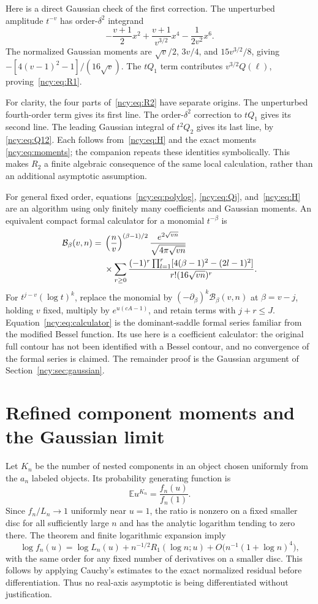 \documentclass[11pt,letterpaper]{article}
\numberwithin{equation}{section}
\theoremstyle{remark}\newtheorem{remark}[theorem]{Remark}
\newcommand{\EE}{\mathbb E}
\theoremstyle{definition}\newtheorem{definition}[theorem]{Definition}\theoremstyle{plain}
\begin{document}
Here is a direct Gaussian check of the first correction. The
unperturbed amplitude $t^{-v}$ has order-$\delta^2$ integrand
\[
 -\frac{v+1}{2}x^2+\frac{v+1}{v^{3/2}}x^4-\frac1{2v^2}x^6.
\]
The normalized Gaussian moments are $\sqrt v/2$, $3v/4$, and
$15v^{3/2}/8$, giving $-[4(v-1)^2-1]/(16\sqrt v)$. The $tQ_1$ term
contributes $v^{3/2}Q(\ell)$, proving~\eqref{ncy:eq:R1}.

For clarity, the four parts of~\eqref{ncy:eq:R2} have separate origins.
The unperturbed fourth-order term gives its first line. The
order-$\delta^2$ correction to $tQ_1$ gives its second line. The
leading Gaussian integral of $t^2Q_2$ gives its last line, by
\eqref{ncy:eq:Q12}. Each follows from~\eqref{ncy:eq:H} and the exact moments
\eqref{ncy:eq:moments}; the companion repeats these identities symbolically.
This makes $R_2$ a finite algebraic consequence of the same local
calculation, rather than an additional asymptotic assumption.

For general fixed order, equations~\eqref{ncy:eq:polylog},
\eqref{ncy:eq:Qj}, and~\eqref{ncy:eq:H} are an algorithm using only finitely
many coefficients and Gaussian moments. An equivalent compact
formal calculator for a monomial $t^{-\beta}$ is
\begin{align}\label{ncy:eq:calculator}
 \mathcal B_\beta(v,n)={}&
 \left(\frac nv\right)^{(\beta-1)/2}
 \frac{e^{2\sqrt{vn}}}{\sqrt{4\pi\sqrt{vn}}}\notag\\
 &\times\sum_{r\geq0}
 \frac{(-1)^r\prod_{l=1}^r[4(\beta-1)^2-(2l-1)^2]}
      {r!(16\sqrt{vn})^r}.
\end{align}
For $t^{j-v}(\log t)^k$, replace the monomial by
$(-\partial_\beta)^k\mathcal B_\beta(v,n)$ at $\beta=v-j$,
holding $v$ fixed, multiply by $e^{u(cA-1)}$, and retain terms with
$j+r\leq J$. Equation~\eqref{ncy:eq:calculator} is the dominant-saddle
formal series familiar from the modified Bessel function. Its use
here is a coefficient calculator: the original full contour has not
been identified with a Bessel contour, and no convergence of the
formal series is claimed. The remainder proof is the Gaussian
argument of Section~\ref{ncy:sec:gaussian}.

\section{Refined component moments and the Gaussian limit}\label{ncy:sec:probability}
Let $K_n$ be the number of nested components in an object chosen
uniformly from the $a_n$ labeled objects. Its probability generating
function is
\[
 \EE u^{K_n}=\frac{f_n(u)}{f_n(1)}.
\]
Since $f_n/L_n\to1$ uniformly near $u=1$, the ratio is nonzero on a
fixed smaller disc for all sufficiently large $n$ and has the analytic
logarithm tending to zero there. The theorem and finite logarithmic
expansion imply
\begin{equation}\label{ncy:eq:logf}
 \log f_n(u)=\log L_n(u)+n^{-1/2}R_1(\log n;u)
          +O\bigl(n^{-1}(1+\log n)^4\bigr),
\end{equation}
with the same order for any fixed number of derivatives on a smaller
disc. This follows by applying Cauchy's estimates to the exact
normalized residual before differentiation. Thus no real-axis
asymptotic is being differentiated without justification.
\end{document}
